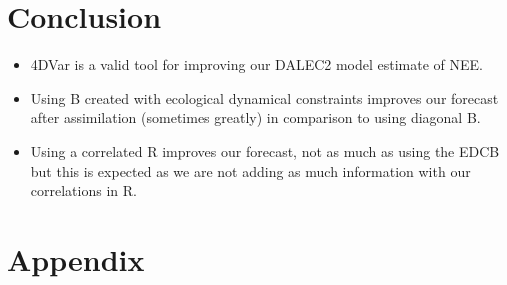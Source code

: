 \documentclass[11pt]{article}
\begin{document}
\section{Conclusion}

\begin{itemize}
\item 4DVar is a valid tool for improving our DALEC2 model estimate of NEE.
\item Using B created with ecological dynamical constraints improves our forecast after assimilation (sometimes greatly) in comparison to using diagonal B.
\item Using a correlated R improves our forecast, not as much as using the EDCB but this is expected as we are not adding as much information with our correlations in R.
\end{itemize}

{}
%

\section*{Appendix}
\end{document}
